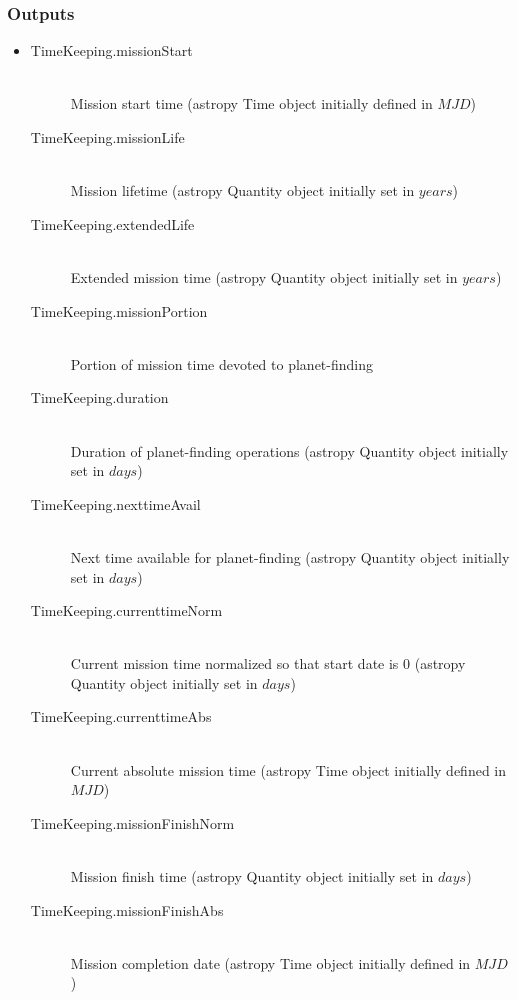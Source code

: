 \documentclass[cleanfoot]{asme2ej}
\begin{document}
\subsubsection*{Outputs}
\begin{itemize}
    \item
    \begin{description}
        \item[TimeKeeping.missionStart] \hfill \\
        Mission start time (astropy Time object initially defined in $ MJD $)
        \item[TimeKeeping.missionLife] \hfill \\
        Mission lifetime (astropy Quantity object initially set in $ years $)
        \item[TimeKeeping.extendedLife] \hfill \\
        Extended mission time (astropy Quantity object initially set in $ years $)
        \item[TimeKeeping.missionPortion] \hfill \\
        Portion of mission time devoted to planet-finding
        \item[TimeKeeping.duration] \hfill \\
        Duration of planet-finding operations (astropy Quantity object initially set in $ days $)
        \item[TimeKeeping.nexttimeAvail] \hfill \\
        Next time available for planet-finding (astropy Quantity object initially set in $ days $)
        \item[TimeKeeping.currenttimeNorm] \hfill \\
        Current mission time normalized so that start date is 0 (astropy Quantity object initially set in $ days $)
        \item[TimeKeeping.currenttimeAbs] \label{sec:currenttime}\hfill \\
        Current absolute mission time (astropy Time object initially defined in $ MJD $)
        \item[TimeKeeping.missionFinishNorm] \hfill \\
        Mission finish time (astropy Quantity object initially set in $ days $)
        \item[TimeKeeping.missionFinishAbs] \hfill \\
        Mission completion date (astropy Time object initially defined in $ MJD $)

    \end{description}
\end{itemize}
\end{document}
